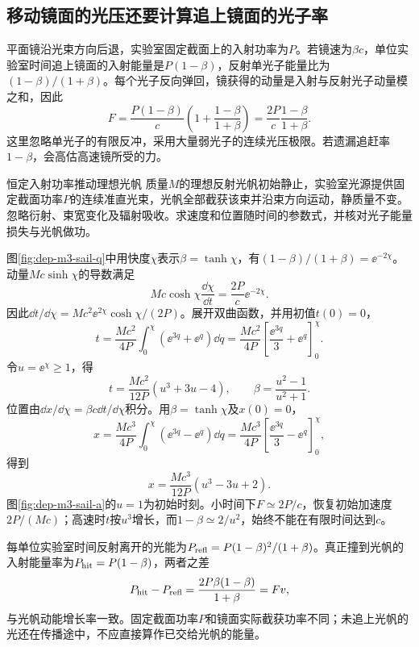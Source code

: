 \subsection{移动镜面的光压还要计算追上镜面的光子率}
平面镜沿光束方向后退，实验室固定截面上的入射功率为$P$。若镜速为$\beta c$，单位实验室时间追上镜面的入射能量是$P(1-\beta)$，反射单光子能量比为$(1-\beta)/(1+\beta)$。每个光子反向弹回，镜获得的动量是入射与反射光子动量模之和，因此
\[
 F=\frac{P(1-\beta)}c\left(1+\frac{1-\beta}{1+\beta}\right)
 =\frac{2P}{c}\frac{1-\beta}{1+\beta}.
\]
这里忽略单光子的有限反冲，采用大量弱光子的连续光压极限。若遗漏追赶率$1-\beta$，会高估高速镜所受的力。

\begin{example}恒定入射功率推动理想光帆
质量$M$的理想反射光帆初始静止，实验室光源提供固定截面功率$P$的连续准直光束，光帆全部截获该束并沿束方向运动，静质量不变。忽略衍射、束宽变化及辐射吸收。求速度和位置随时间的参数式，并核对光子能量损失与光帆做功。
\end{example}
\begin{solution}
图\ref{fig:dep-m3-sail-q}中用快度$\chi$表示$\beta=\tanh\chi$，有$(1-\beta)/(1+\beta)=\ee^{-2\chi}$。动量$Mc\sinh\chi$的导数满足
\[
 Mc\cosh\chi\frac{\dd\chi}{\dd t}=\frac{2P}c\ee^{-2\chi}.
\]
因此$\dd t/\dd\chi=Mc^2\ee^{2\chi}\cosh\chi/(2P)$。展开双曲函数，并用初值$t(0)=0$，
\[
 t=\frac{Mc^2}{4P}\int_0^\chi(\ee^{3q}+\ee^q)\dd q
 =\frac{Mc^2}{4P}\left[\frac{\ee^{3q}}3+\ee^q\right]_0^\chi.
\]
令$u=\ee^\chi\geq1$，得
\[
 t=\frac{Mc^2}{12P}(u^3+3u-4),\qquad
 \beta=\frac{u^2-1}{u^2+1}.
\]
位置由$\dd x/\dd\chi=\beta c\dd t/\dd\chi$积分。用$\beta=\tanh\chi$及$x(0)=0$，
\[
 x=\frac{Mc^3}{4P}\int_0^\chi(\ee^{3q}-\ee^q)\dd q
 =\frac{Mc^3}{4P}\left[\frac{\ee^{3q}}3-\ee^q\right]_0^\chi,
\]
得到
\[
 x=\frac{Mc^3}{12P}(u^3-3u+2).
\]
图\ref{fig:dep-m3-sail-a}的$u=1$为初始时刻。小时间下$F\simeq2P/c$，恢复初始加速度$2P/(Mc)$；高速时$t$按$u^3$增长，而$1-\beta\simeq2/u^2$，始终不能在有限时间达到$c$。

每单位实验室时间反射离开的光能为$P_{\rm refl}=P(1-\beta)^2/(1+\beta)$。真正撞到光帆的入射能量率为$P_{\rm hit}=P(1-\beta)$，两者之差
\[
 P_{\rm hit}-P_{\rm refl}=\frac{2P\beta(1-\beta)}{1+\beta}=Fv,
\]
与光帆动能增长率一致。固定截面功率$P$和镜面实际截获功率不同；未追上光帆的光还在传播途中，不应直接算作已交给光帆的能量。
\end{solution}
